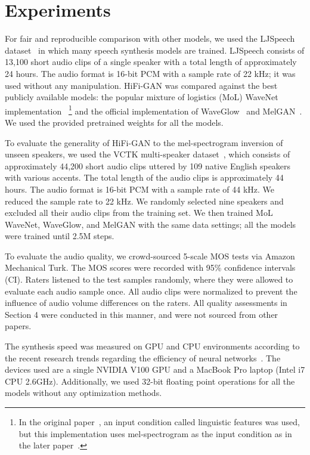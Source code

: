 \section{Experiments}

For fair and reproducible comparison with other models, we used the LJSpeech dataset~\citep{ljspeech17} in which many speech synthesis models are trained. LJSpeech consists of 13,100 short audio clips of a single speaker with a total length of approximately 24 hours. The audio format is 16-bit PCM with a sample rate of 22 kHz; it was used without any manipulation. HiFi-GAN was compared against the best publicly available models: the popular mixture of logistics (MoL) WaveNet~\citep{oord2018parallel} implementation~\citep{Yamamoto18wavenet}
\footnote{In the original paper~\citep{oord2018parallel}, an input condition called linguistic features was used, but this implementation uses mel-spectrogram as the input condition as in the later paper~\citep{shen2018natural}.} and the official implementation of WaveGlow~\citep{WaveGlowRepo} and MelGAN~\citep{MelGANRepo}. We used the provided pretrained weights for all the models.

To evaluate the generality of HiFi-GAN to the mel-spectrogram inversion of unseen speakers, we used the VCTK multi-speaker dataset~\citep{veaux2017cstr}, which consists of approximately 44,200 short audio clips uttered by 109 native English speakers with various accents. The total length of the audio clips is approximately 44 hours. The audio format is 16-bit PCM with a sample rate of 44 kHz. We reduced the sample rate to 22 kHz. We randomly selected nine speakers and excluded all their audio clips from the training set. We then trained MoL WaveNet, WaveGlow, and MelGAN with the same data settings; all the models were trained until 2.5M steps.

To evaluate the audio quality, we crowd-sourced 5-scale MOS tests via Amazon Mechanical Turk. The MOS scores were recorded with 95\% confidence intervals (CI). Raters listened to the test samples randomly, where they were allowed to evaluate each audio sample once. All audio clips were normalized to prevent the influence of audio volume differences on the raters. 
All quality assessments in Section 4 were conducted in this manner, and were not sourced from other papers.

The synthesis speed was measured on GPU and CPU environments according to the recent research trends regarding the efficiency of neural networks~\citep{Kumar2018melgan, zhai2020squeezewave, tan2020efficientdet}. The devices used are a single NVIDIA V100 GPU and a MacBook Pro laptop (Intel i7 CPU 2.6GHz). Additionally, we used 32-bit floating point operations for all the models without any optimization methods.

